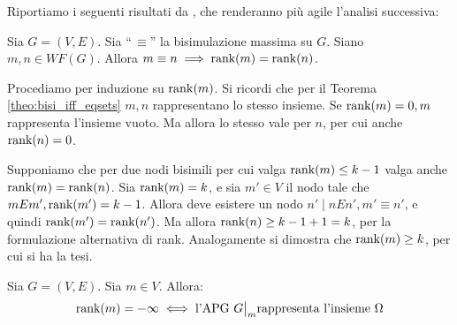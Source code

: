 Riportiamo i seguenti risultati da \cite{dovier}, che renderanno più agile l'analisi successiva:
\begin{proposition} \label{prop:rank_bisi_imp_wf}
    Sia $G = (V,E)$. Sia ``\,$\equiv$'' la bisimulazione massima su $G$. Siano $m,n \in WF(G)$. Allora $m \equiv n \implies \textup{rank}(m) = \textup{rank}(n)$.
\end{proposition}
\begin{proof2}
    Procediamo per induzione su $\textup{rank}(m)$. Si ricordi che per il Teorema \ref{theo:bisi_iff_eqsets} $m,n$ rappresentano lo stesso insieme. Se $\textup{rank}(m) = 0, m$ rappresenta l'insieme vuoto. Ma allora lo stesso vale per $n$, per cui anche $\textup{rank}(n) = 0$.

    Supponiamo che per due nodi bisimili per cui valga $\textup{rank}(m) \leq k-1$ valga anche $\textup{rank}(m) = \textup{rank}(n)$. Sia $\textup{rank}(m) = k$, e sia $m' \in V$ il nodo tale che $m E m', \textup{rank}(m') = k-1$. Allora deve esistere un nodo $n' \mid n E n', m' \equiv n'$, e quindi $\textup{rank}(m') = \textup{rank}(n')$. Ma allora $\textup{rank}(n) \geq k-1 + 1 = k$, per la formulazione alternativa di rank. Analogamente si dimostra che $\textup{rank}(m) \geq k$, per cui si ha la tesi.
\end{proof2}
\begin{proposition}
    \label{prop:omega_rank}
    Sia $G = (V,E)$. Sia $m \in V$. Allora:
    \begin{gather*}
        \rankfunc(m) = -\infty \iff \text{l'APG } \restr{G}{m} \text{rappresenta l'insieme } \Omega
    \end{gather*}
\end{proposition}
